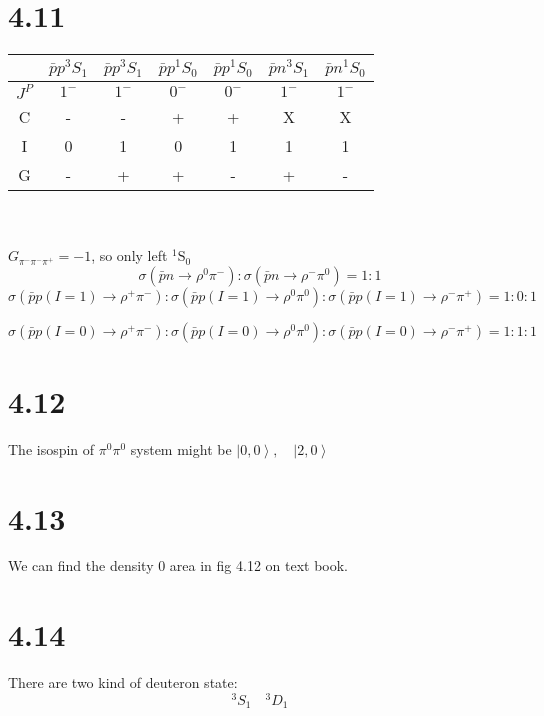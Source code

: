 \documentclass{article}
\begin{document}
\begin{CJK*}{GBK}{song}
\section{4.11}
\begin{tabular}{|c|c|c|c|c|c|c|}%
\hline  %
    &   $ \bar{p}p^3S_1 $ & $ \bar{p}p^3S_1 $   & $ \bar{p}p^1S_0 $   & $ \bar{p}p^1S_0 $    & $ \bar{p}n^3S_1 $   &$ \bar{p}n^1S_0 $ \\
\hline  %
$J^P$    &  $1^-$  & $1^-$   & $0^-$   & $0^-$   & $1^-$  &  $1^-$\\
\hline %
C   &  -  &  -  &  +  & +   &  X &  X\\
\hline    
I    &   0  &  1  &  0  &  1  & 1  &1\\
\hline 
G    & -   &  +  & +   &  -  &  + &  -\\
\hline 
\end{tabular}\\
\\
$G_{\pi^-\pi^-\pi^+}=-1$, so only left $^1\text{S}_0$
\begin{equation}
\sigma(\bar{p}n\rightarrow\rho^0\pi^-):\sigma(\bar{p}n\rightarrow\rho^-\pi^0)=1:1
\end{equation}
\begin{equation}
\sigma(\bar{p}p(I=1)\rightarrow\rho^+\pi^-):\sigma(\bar{p}p(I=1)\rightarrow\rho^0\pi^0):\sigma(\bar{p}p(I=1)\rightarrow\rho^-\pi^+)=1:0:1
\end{equation}

\begin{equation}
\sigma(\bar{p}p(I=0)\rightarrow\rho^+\pi^-):\sigma(\bar{p}p(I=0)\rightarrow\rho^0\pi^0):\sigma(\bar{p}p(I=0)\rightarrow\rho^-\pi^+)=1:1:1
\end{equation}



\section{4.12}
The isospin of $\pi^0\pi^0$ system might be $\left|0,0\right\rangle,\quad \left|2,0\right\rangle$ 

\section{4.13}
We can find the density 0 area in fig 4.12 on text book.
\section{4.14}
There are two kind of deuteron state:
\begin{equation}
^3S_1 \quad ^3D_1
\end{equation}

\end{CJK*}
\end{document}
